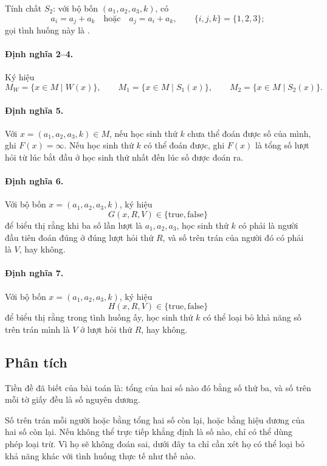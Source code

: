 \documentclass[11pt]{article}
\begin{document}
Tính chất \(S_2\): với bộ bốn \((a_1,a_2,a_3,k)\), có
\[
  a_i=a_j+a_k \quad\text{hoặc}\quad a_j=a_i+a_k,
  \qquad \{i,j,k\}=\{1,2,3\};
\]
gọi tình huống này là .

\paragraph{Định nghĩa 2--4.}
Ký hiệu
\[
  M_W=\{x\in M\mid W(x)\},\qquad
  M_1=\{x\in M\mid S_1(x)\},\qquad
  M_2=\{x\in M\mid S_2(x)\}.
\]

\paragraph{Định nghĩa 5.}
Với \(x=(a_1,a_2,a_3,k)\in M\), nếu học sinh thứ \(k\) chưa thể đoán được số
của mình, ghi \(F(x)=\infty\). Nếu học sinh thứ \(k\) có thể đoán được, ghi
\(F(x)\) là tổng số lượt hỏi từ lúc bắt đầu ở học sinh thứ nhất đến lúc số
được đoán ra.

\paragraph{Định nghĩa 6.}
Với bộ bốn \(x=(a_1,a_2,a_3,k)\), ký hiệu
\[
  G(x,R,V)\in\{\mathrm{true},\mathrm{false}\}
\]
để biểu thị rằng khi ba số lần lượt là \(a_1,a_2,a_3\), học sinh thứ \(k\) có
phải là người đầu tiên đoán đúng ở đúng lượt hỏi thứ \(R\), và số trên trán
của người đó có phải là \(V\), hay không.

\paragraph{Định nghĩa 7.}
Với bộ bốn \(x=(a_1,a_2,a_3,k)\), ký hiệu
\[
  H(x,R,V)\in\{\mathrm{true},\mathrm{false}\}
\]
để biểu thị rằng trong tình huống ấy, học sinh thứ \(k\) có thể loại bỏ khả
năng số trên trán mình là \(V\) ở lượt hỏi thứ \(R\), hay không.

\subsection*{Phân tích}

Tiền đề đã biết của bài toán là: tổng của hai số nào đó bằng số thứ ba, và số
trên mỗi tờ giấy đều là số nguyên dương.

Số trên trán mỗi người hoặc bằng tổng hai số còn lại, hoặc bằng hiệu dương
của hai số còn lại. Nếu không thể trực tiếp khẳng định là số nào, chỉ có thể
dùng phép loại trừ. Vì họ sẽ không đoán sai, dưới đây ta chỉ cần xét họ có
thể loại bỏ khả năng khác với tình huống thực tế như thế nào.
\end{document}
